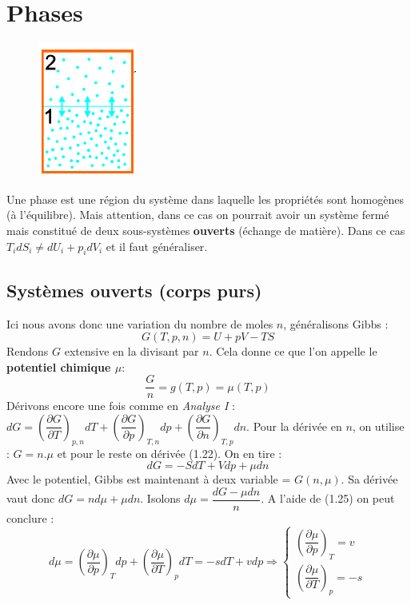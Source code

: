 \documentclass[11pt, a4paper, openany]{book}
\begin{document}
\section{Phases}
\begin{figure}
\includegraphics[scale=0.4]{cp/image4.png}
\end{figure}
Une phase est une région du système dans laquelle les propriétés sont homogènes (à l'équilibre). Mais attention, dans ce cas on pourrait avoir un système fermé mais constitué de deux sous-systèmes \textbf{ouverts } (échange de matière). Dans ce cas $T_idS_i \neq dU_i + p_idV_i$ et il faut généraliser.

\subsection{Systèmes ouverts (corps purs)}
Ici nous avons donc une variation du nombre de moles $n$, généralisons Gibbs :
\begin{equation}
G(T,p,n) = U + pV - TS
\end{equation}
Rendons $G$ extensive en la divisant par $n$. Cela donne ce que l'on appelle le \textbf{potentiel chimique $\mu$}:
\begin{equation}
\frac{G}{n} = g(T, p) = \mu(T,p)
\end{equation}
Dérivons encore une fois comme en \textit{Analyse I} :\\
 $dG = \left(\dfrac{\partial G}{\partial T}\right)_{p,n} dT + \left(\dfrac{\partial G}{\partial p}\right)_{T,n} dp +  \left(\dfrac{\partial G}{\partial n}\right)_{T,p}dn$. Pour la dérivée en $n$, on utilise : $G = n.\mu$ et pour le reste on dérivée (1.22). On en tire :
\begin{equation}
dG = -SdT + Vdp + \mu dn
\end{equation}
Avec le potentiel, Gibbs est maintenant à deux variable = $G(n,\mu)$. Sa dérivée vaut donc $dG = nd\mu + \mu dn$. Isolons $d\mu = \dfrac{dG - \mu dn}{n}$. A l'aide de (1.25) on peut conclure :
\begin{equation}
d\mu =\left(\frac{\partial\mu}{\partial p}\right)_Tdp+\left(\frac{\partial\mu}{\partial T}\right)_pdT= -sdT + vdp\Rightarrow\left\{\begin{array}{l}
\left(\dfrac{\partial \mu}{\partial p}\right)_T = v\\
\left(\dfrac{\partial \mu}{\partial T}\right)_p = -s
\end{array}\right.
\end{equation}
\end{document}
